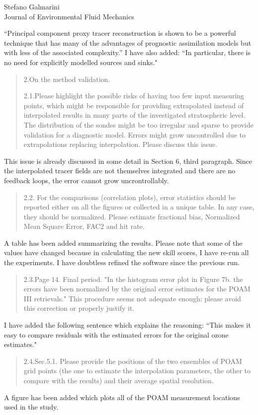 \documentclass{letter}
\begin{document}
\begin{letter}{Stefano Galmarini\\
Journal of Environmental Fluid Mechanics}
\begin{quote}
\end{quote}
``Principal component proxy tracer reconstruction is shown to be a powerful
technique that 
has many of the advantages of prognostic assimilation models but with
less of the associated complexity.'' I have also added:
``In particular, there is no need for explicitly modelled sources and sinks."
\begin{quote}
2.On the method validation.

2.1.Please highlight the possible risks of having too few input measuring points, which might be responsible for providing extrapolated instead of interpolated results in many parts of the investigated stratospheric level. The distribution of the sondes might be too irregular and sparse to provide validation for a diagnostic model. Errors might grow uncontrolled due to extrapolations replacing interpolation. Please discuss this issue.
\end{quote}
This issue is already discussed in some detail in Section 6, third
paragraph.
Since the interpolated tracer fields are not themselves integrated and there are no feedback loops, the error
cannot grow uncrontrollably.
\begin{quote}
2.2. For the comparisons (correlation plots), error statistics should be reported either on all the figures or collected in a unique table. In any case, they should be normalized. Please estimate fractional bias, Normalized Mean Square Error, FAC2 and hit rate.
\end{quote}
A table has been added summarizing the results.
Please note that some of the values have changed because in calculating the
new skill scores, I have re-run all the experiments. I have doubtless refined
the software since the previous run.
\begin{quote}
2.3.Page 14. Final period. "In the histogram error plot in Figure 7b. the errors have been normalized by the original error estimates for the POAM III retrievals." This procedure seems not adequate enough: please avoid this correction or properly justify it.
\end{quote}
I have added the following sentence which explains the reasoning:
``This makes it easy to compare residuals with the estimated errors
for the original ozone estimates."
\begin{quote}
2.4.Sec.5.1. Please provide the positions of the two ensembles of POAM grid points (the one to estimate the interpolation parameters, the other to compare with the results) and their average spatial resolution.
\end{quote}
A figure has been added which plots all of the POAM measurement locations used
in the study.


\end{letter}
\end{document}
